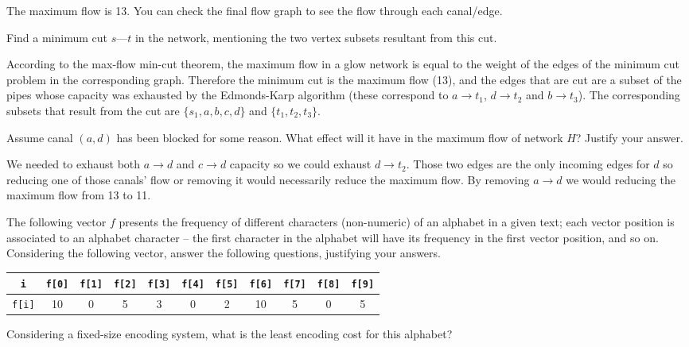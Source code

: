 {The maximum flow is 13. You can check the final flow graph to see the flow through each canal/edge.

Find a minimum cut $s\text{---}t$ in the network, mentioning the two vertex subsets resultant from this cut.

\ansseparator

According to the max-flow min-cut theorem, the maximum flow in a glow network is equal to the weight of the edges of the minimum cut problem in the corresponding graph. Therefore the minimum cut is the maximum flow (13), and the edges that are cut are a subset of the pipes whose capacity was exhausted by the Edmonds-Karp algorithm (these correspond to $a \rightarrow t_1$, $d \rightarrow t_2$ and $b \rightarrow t_3$). The corresponding subsets that result from the cut are $\{s_1, a, b, c, d\}$ and $\{t_1, t_2, t_3\}$.

Assume canal $(a,d)$ has been blocked for some reason. What effect will it have in the maximum flow of network $H$? Justify your answer.

\ansseparator

We needed to exhaust both $a \rightarrow d$ and $c \rightarrow d$ capacity so we could exhaust $d \rightarrow t_2$. Those two edges are the only incoming edges for $d$ so reducing one of those canals' flow or removing it would necessarily reduce the maximum flow. By removing $a \rightarrow d$ we would reducing the maximum flow from 13 to 11.

The following vector $f$ presents the frequency of different characters (non-numeric) of an alphabet in a given text; each vector position is associated to an alphabet character -- the first character in the alphabet will have its frequency in the first vector position, and so on. Considering the following vector, answer the following questions, justifying your answers.

\begin{center}
    \begin{tabular}{c | c c c c c c c c c c}
        \texttt{i} & \texttt{f[0]} & \texttt{f[1]} & \texttt{f[2]} & \texttt{f[3]} & \texttt{f[4]} & \texttt{f[5]} & \texttt{f[6]} & \texttt{f[7]} & \texttt{f[8]} & \texttt{f[9]} \\ \hline
        \texttt{f[i]} & 10 & 0 & 5 & 3 & 0 & 2 & 10 & 5 & 0 & 5
    \end{tabular}
\end{center}

Considering a fixed-size encoding system, what is the least encoding cost for this alphabet?

}
